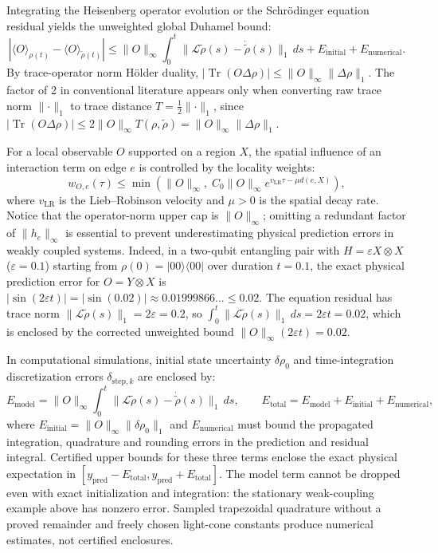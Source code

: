 \documentclass[
  11pt,
]{article}
\begin{document}
Integrating the Heisenberg operator evolution or the Schrödinger equation residual yields the unweighted global Duhamel bound:
\[
|\langle O\rangle_{\rho(t)} - \langle O\rangle_{\widetilde\rho(t)}| \le \lVert O\rVert_\infty \int_0^t \lVert \mathcal L\widetilde\rho(s) - \dot{\widetilde\rho}(s)\rVert_1\,ds + E_{\mathrm{initial}} + E_{\mathrm{numerical}}.
\]
By trace-operator norm Hölder duality, \(|\operatorname{Tr}(O \Delta\rho)| \le \lVert O\rVert_\infty \lVert\Delta\rho\rVert_1\). The factor of 2 in conventional literature appears only when converting raw trace norm \(\lVert\cdot\rVert_1\) to trace distance \(T = \frac{1}{2}\lVert\cdot\rVert_1\), since \(|\operatorname{Tr}(O \Delta\rho)| \le 2 \lVert O\rVert_\infty T(\rho, \widetilde{\rho}) = \lVert O\rVert_\infty \lVert\Delta\rho\rVert_1\).

For a local observable \(O\) supported on a region \(X\), the spatial influence of an interaction term on edge \(e\) is controlled by the locality weights:
\[
w_{O,e}(\tau) \le \min\left(\lVert O\rVert_\infty,\; C_0 \lVert O\rVert_\infty e^{v_{\mathrm{LR}}\tau - \mu d(e, X)}\right),
\]
where \(v_{\mathrm{LR}}\) is the Lieb--Robinson velocity and \(\mu > 0\) is the spatial decay rate.
Notice that the operator-norm upper cap is \(\lVert O\rVert_\infty\); omitting a redundant factor of \(\lVert h_e\rVert_\infty\) is essential to prevent underestimating physical prediction errors in weakly coupled systems.
Indeed, in a two-qubit entangling pair with \(H = \varepsilon X\otimes X\) (\(\varepsilon = 0.1\)) starting from \(\rho(0) = |00\rangle\langle 00|\) over duration \(t = 0.1\), the exact physical prediction error for \(O = Y\otimes X\) is \(|\sin(2\varepsilon t)| = |\sin(0.02)| \approx 0.01999866... \le 0.02\). The equation residual has trace norm \(\lVert\mathcal L\widetilde\rho(s)\rVert_1 = 2\varepsilon = 0.2\), so \(\int_0^t \lVert\mathcal L\widetilde\rho(s)\rVert_1\,ds = 2\varepsilon t = 0.02\), which is enclosed by the corrected unweighted bound \(\lVert O\rVert_\infty (2\varepsilon t) = 0.02\).

In computational simulations, initial state uncertainty \(\delta\rho_0\) and time-integration discretization errors \(\delta_{\mathrm{step}, k}\) are enclosed by:
\[
E_{\mathrm{model}}=\lVert O\rVert_\infty\int_0^t
 \lVert\mathcal L\widetilde\rho(s)-\dot{\widetilde\rho}(s)\rVert_1\,ds,
\qquad
E_{\mathrm{total}}=E_{\mathrm{model}}+E_{\mathrm{initial}}+E_{\mathrm{numerical}},
\]
where \(E_{\mathrm{initial}}=\lVert O\rVert_\infty\lVert\delta\rho_0\rVert_1\)
and \(E_{\mathrm{numerical}}\) must bound the propagated integration, quadrature
and rounding errors in the prediction and residual integral. Certified upper
bounds for these three terms enclose the exact physical expectation in
\([y_{\mathrm{pred}}-E_{\mathrm{total}},y_{\mathrm{pred}}+E_{\mathrm{total}}]\).
The model term cannot be dropped even with exact initialization and integration:
the stationary weak-coupling example above has nonzero error. Sampled trapezoidal
quadrature without a proved remainder and freely chosen light-cone constants
produce numerical estimates, not certified enclosures.
\end{document}
